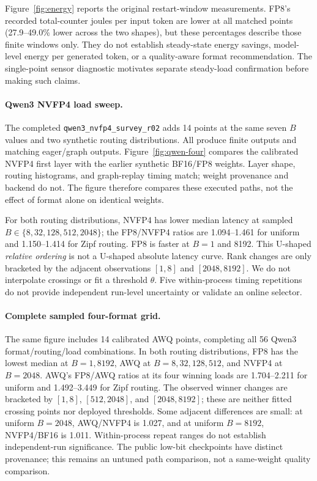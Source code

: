\documentclass[10pt,twocolumn]{article}
\begin{document}
Figure~\ref{fig:energy} reports the original restart-window measurements.
FP8's recorded total-counter joules per input token are lower at all matched
points (27.9--49.0\% lower across the two shapes), but these percentages
describe those finite windows only. They do not establish steady-state
energy savings, model-level energy per generated token, or a quality-aware
format recommendation. The single-point sensor diagnostic motivates
separate steady-load confirmation before making such claims.

\paragraph{Qwen3 NVFP4 load sweep.}
The completed \texttt{qwen3\_nvfp4\_survey\_r02} adds 14 points at the same
seven $B$ values and two synthetic routing distributions. All produce finite
outputs and matching eager/graph outputs. Figure~\ref{fig:qwen-four}
compares the calibrated NVFP4 first layer with the earlier synthetic
BF16/FP8 weights. Layer shape, routing histograms, and graph-replay timing
match; weight provenance and backend do not. The figure therefore compares
these executed paths, not the effect of format alone on identical weights.

For both routing distributions, NVFP4 has lower median latency at sampled
$B\in\{8,32,128,512,2048\}$; the FP8/NVFP4 ratios are 1.094--1.461 for
uniform and 1.150--1.414 for Zipf routing. FP8 is faster at $B=1$ and 8192.
This U-shaped \emph{relative ordering} is not a U-shaped absolute latency
curve. Rank changes are only bracketed by the adjacent observations
$[1,8]$ and $[2048,8192]$. We do not interpolate crossings or fit a
threshold $\theta$. Five within-process timing repetitions do not provide
independent run-level uncertainty or validate an online selector.

\paragraph{Complete sampled four-format grid.}
The same figure includes 14 calibrated AWQ points, completing all 56
Qwen3 format/routing/load combinations. In both routing distributions,
FP8 has the lowest median at $B=1,8192$, AWQ at $B=8,32,128,512$, and
NVFP4 at $B=2048$. AWQ's FP8/AWQ ratios at its four winning loads are
1.704--2.211 for uniform and 1.492--3.449 for Zipf routing. The observed
winner changes are bracketed by $[1,8]$, $[512,2048]$, and $[2048,8192]$;
these are neither fitted crossing points nor deployed thresholds. Some
adjacent differences are small: at uniform $B=2048$, AWQ/NVFP4 is 1.027,
and at uniform $B=8192$, NVFP4/BF16 is 1.011. Within-process repeat ranges
do not establish independent-run significance. The public low-bit
checkpoints have distinct provenance; this remains an untuned path
comparison, not a same-weight quality comparison.
\end{document}
